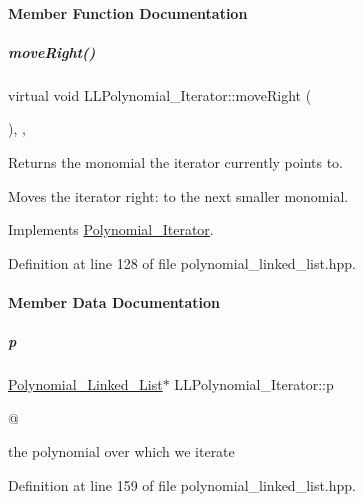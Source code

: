 \paragraph{Member Function Documentation}
\mbox{\label{group___iterator_group_a2bb830c4e310d91b39e55b05ce86840c}} 
\subparagraph{\texorpdfstring{move\+Right()}{moveRight()}}
{\footnotesize\ttfamily virtual void L\+L\+Polynomial\+\_\+\+Iterator\+::move\+Right (\begin{DoxyParamCaption}{ }\end{DoxyParamCaption})\hspace{0.3cm}{\ttfamily [inline]}, {\ttfamily [override]}, {\ttfamily [virtual]}}



Returns the monomial the iterator currently points to. 

Moves the iterator right\+: to the next smaller monomial. 

Implements \hyperlink{group___iterator_group_ad7adb26df3077c6c7dec39e066436ce9}{Polynomial\+\_\+\+Iterator}.



Definition at line 128 of file polynomial\+\_\+linked\+\_\+list.\+hpp.



\paragraph{Member Data Documentation}
\mbox{\label{group___iterator_group_a50151664e42e30b845a0a0d11577cfff}} 
\subparagraph{\texorpdfstring{p}{p}}
{\footnotesize\ttfamily \hyperlink{group__polygroup_class_polynomial___linked___list}{Polynomial\+\_\+\+Linked\+\_\+\+List}$\ast$ L\+L\+Polynomial\+\_\+\+Iterator\+::p\hspace{0.3cm}{\ttfamily [protected]}}



@ 

the polynomial over which we iterate 

Definition at line 159 of file polynomial\+\_\+linked\+\_\+list.\+hpp.

